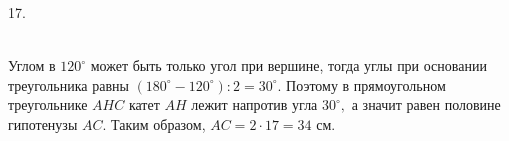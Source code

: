 17. \begin{figure}[ht!]
\end{figure}\\
Углом в $120^\circ$ может быть только угол при вершине, тогда углы при основании треугольника равны $(180^\circ-120^\circ):2=30^\circ.$ Поэтому в прямоугольном треугольнике $AHC$ катет $AH$ лежит напротив угла $30^\circ,$ а значит равен половине гипотенузы $AC.$ Таким образом, $AC=2\cdot17=34$ см.\\
